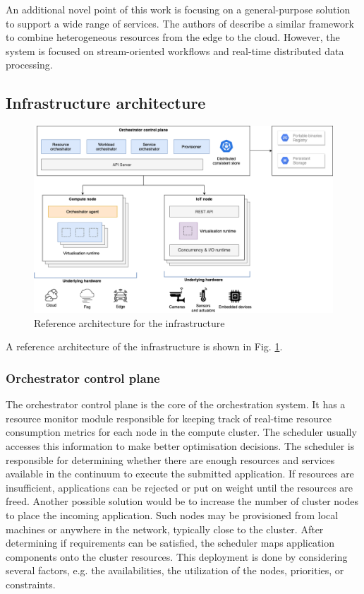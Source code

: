 An additional novel point of this work is focusing on a general-purpose solution to support a wide range of services. The authors of \cite{balouek2019towards} describe a similar framework to combine heterogeneous resources from the edge to the cloud. However, the system is focused on stream-oriented workflows and real-time distributed data processing.

\subsection{Infrastructure architecture}

\begin{figure}[ht]
\centering
\includegraphics[width=\columnwidth]{figures/architecture-broad}
\caption{Reference architecture for the infrastructure \label{fig:architecture-broad}}
\end{figure}

A reference architecture of the infrastructure is shown in Fig. \ref{fig:architecture-broad}.

\subsubsection{Orchestrator control plane}

The orchestrator control plane is the core of the orchestration system. It has a resource monitor module responsible for keeping track of real-time resource consumption metrics for each node in the compute cluster. The scheduler usually accesses this information to make better optimisation decisions. The scheduler is responsible for determining whether there are enough resources and services available in the continuum to execute the submitted application. If resources are insufficient, applications can be rejected or put on weight until the resources are freed. Another possible solution would be to increase the number of cluster nodes to place the incoming application. Such nodes may be provisioned from local machines or anywhere in the network, typically close to the cluster. After determining if requirements can be satisfied, the scheduler maps application components onto the cluster resources. This deployment is done by considering several factors, e.g. the availabilities, the utilization of the nodes, priorities, or constraints.

